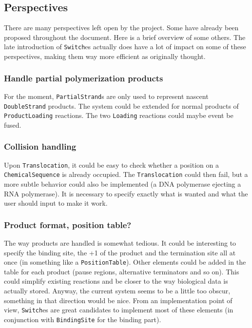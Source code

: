 
\subsection{Perspectives}

There are many perspectives left open by the project. Some have already been proposed throughout the document. Here is a brief overview of some others. The late introduction of \texttt{Switch}es actually does have a lot of impact on some of these perspectives, making them way more efficient as originally thought.

\subsubsection{Handle partial polymerization products}

For the moment, \texttt{PartialStrand}s are only used to represent nascent \texttt{DoubleStrand} products. The system could be extended for normal products of \texttt{ProductLoading} reactions. The two \texttt{Loading} reactions could maybe event be fused.

\subsubsection{Collision handling}

Upon \texttt{Translocation}, it could be easy to check whether a position on a \texttt{ChemicalSequence} is already occupied. The \texttt{Translocation} could then fail, but a more subtle behavior could also be implemented (a DNA polymerase ejecting a RNA polymerase). It is necessary to specify exactly what is wanted and what the user should input to make it work.

\subsubsection{Product format, position table?}

The way products are handled is somewhat tedious. It could be interesting to specify the binding site, the +1 of the product and the termination site all at once (in something like a \texttt{PositionTable}). Other elements could be added in the table for each product (pause regions, alternative terminators and so on). This could simplify existing reactions and be closer to the way biological data is actually stored. Anyway, the current system seems to be a little too obscur, something in that direction would be nice. From an implementation point of view, \texttt{Switch}es are great candidates to implement most of these elements (in conjunction with \texttt{BindingSite} for the binding part).


